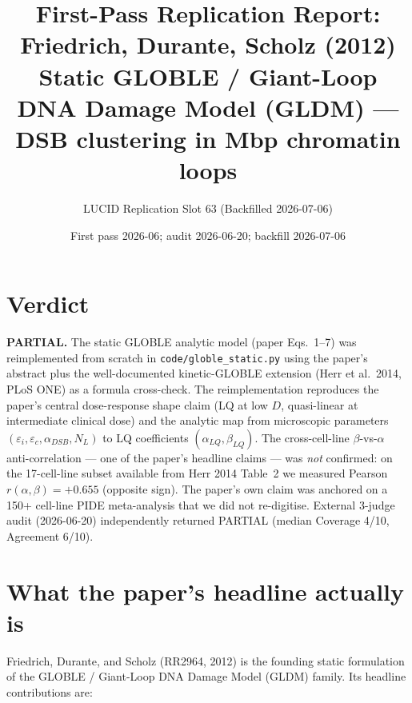 \documentclass[11pt]{article}
\title{First-Pass Replication Report: Friedrich, Durante, Scholz (2012)\\
\large Static GLOBLE / Giant-Loop DNA Damage Model (GLDM) --- DSB clustering in Mbp chromatin loops}
\author{LUCID Replication Slot 63 (Backfilled 2026-07-06)}
\date{First pass 2026-06; audit 2026-06-20; backfill 2026-07-06}
\begin{document}
\maketitle

\section*{Verdict}

\textbf{PARTIAL.} The static GLOBLE analytic model (paper Eqs.~1--7) was
reimplemented from scratch in \verb|code/globle_static.py| using the paper's
abstract plus the well-documented kinetic-GLOBLE extension (Herr et al.\ 2014,
PLoS ONE) as a formula cross-check. The reimplementation reproduces the
paper's central dose-response shape claim (LQ at low $D$, quasi-linear at
intermediate clinical dose) and the analytic map from microscopic parameters
$(\varepsilon_i, \varepsilon_c, \alpha_{DSB}, N_L)$ to LQ coefficients
$(\alpha_{LQ}, \beta_{LQ})$. The cross-cell-line $\beta$-vs-$\alpha$
anti-correlation --- one of the paper's headline claims --- was
\emph{not} confirmed: on the 17-cell-line subset available from Herr 2014
Table~2 we measured Pearson $r(\alpha,\beta)=+0.655$ (opposite sign).
The paper's own claim was anchored on a 150+ cell-line PIDE meta-analysis
that we did not re-digitise. External 3-judge audit (2026-06-20)
independently returned PARTIAL (median Coverage 4/10, Agreement 6/10).

\section{What the paper's headline actually is}

Friedrich, Durante, and Scholz (RR2964, 2012) is the founding static
formulation of the GLOBLE / Giant-Loop DNA Damage Model (GLDM) family. Its
headline contributions are:
\end{document}
